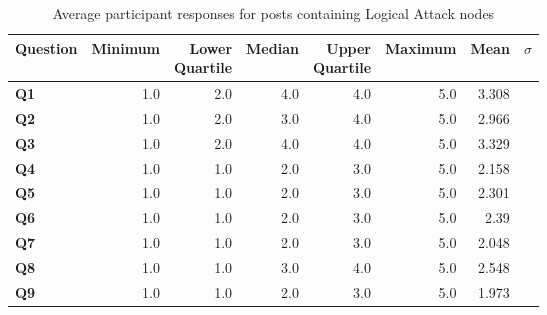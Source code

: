 \begin{table}
\centering
\caption{Average participant responses for posts containing Logical Attack nodes}
\label{table:perception:logical-attack-average}
\begin{tabular}{ l | r | r | r | r | r | r | r}
\textbf{Question} & \textbf{Minimum} & \pbox{2cm}{\textbf{Lower}\\ \textbf{Quartile}} & \textbf{Median} & \pbox{2cm}{\textbf{Upper}\\ \textbf{Quartile}} & \textbf{Maximum} & \textbf{Mean} & \textbf{$\sigma$}\\
\hline
\textbf{Q1} &  1.0 & 2.0 & 4.0 & 4.0 & 5.0 & 3.308 &  \\
\hline
\textbf{Q2} &  1.0 & 2.0 & 3.0 & 4.0 & 5.0 & 2.966 &  \\
\hline
\textbf{Q3} &  1.0 & 2.0 & 4.0 & 4.0 & 5.0 & 3.329 &  \\
\hline
\textbf{Q4} &  1.0 & 1.0 & 2.0 & 3.0 & 5.0 & 2.158 &  \\
\hline
\textbf{Q5} &  1.0 & 1.0 & 2.0 & 3.0 & 5.0 & 2.301 &  \\
\hline
\textbf{Q6} &  1.0 & 1.0 & 2.0 & 3.0 & 5.0 & 2.39 &  \\
\hline
\textbf{Q7} &  1.0 & 1.0 & 2.0 & 3.0 & 5.0 & 2.048 &  \\
\hline
\textbf{Q8} &  1.0 & 1.0 & 3.0 & 4.0 & 5.0 & 2.548 &  \\
\hline
\textbf{Q9} &  1.0 & 1.0 & 2.0 & 3.0 & 5.0 & 1.973 &  \\
\end{tabular}
\end{table}




